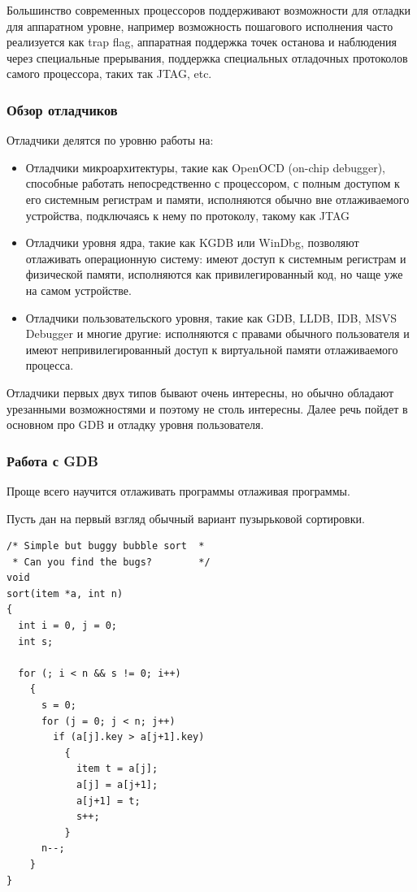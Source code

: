 \documentclass[a4paper,12pt,oneside]{article}
\begin{document}
Большинство современных процессоров поддерживают возможности для отладки для аппаратном уровне, например возможность пошагового исполнения часто реализуется как trap flag, аппаратная поддержка точек останова и наблюдения через специальные прерывания, поддержка специальных отладочных протоколов самого процессора, таких так JTAG, etc.

\subsubsection{Обзор отладчиков}\label{subsubsec:Overview}

Отладчики делятся по уровню работы на:

\begin{itemize}
\item Отладчики микроархитектуры, такие как OpenOCD (on-chip debugger), способные работать непосредственно с процессором, с полным доступом к его системным регистрам и памяти, исполняются обычно вне отлаживаемого устройства, подключаясь к нему по протоколу, такому как JTAG

\item Отладчики уровня ядра, такие как KGDB или WinDbg, позволяют отлаживать операционную систему: имеют доступ к системным регистрам и физической памяти, исполняются как привилегированный код, но чаще уже на самом устройстве.

\item Отладчики пользовательского уровня, такие как GDB, LLDB, IDB, MSVS Debugger и многие другие: исполняются с правами обычного пользователя и имеют непривилегированный доступ к виртуальной памяти отлаживаемого процесса.
\end{itemize}

Отладчики первых двух типов бывают очень интересны, но обычно обладают урезанными возможностями и поэтому не столь интересны. Далее речь пойдет в основном про GDB и отладку уровня пользователя.

\subsubsection{Работа с GDB}\label{subsubsec:GDB}

Проще всего научится отлаживать программы отлаживая программы. 

Пусть дан на первый взгляд обычный вариант пузырьковой сортировки.

\begin{lstlisting}
/* Simple but buggy bubble sort  *
 * Can you find the bugs?        */
void 
sort(item *a, int n) 
{ 
  int i = 0, j = 0;
  int s;

  for (; i < n && s != 0; i++) 
    {
      s = 0;
      for (j = 0; j < n; j++) 
        if (a[j].key > a[j+1].key)   
          {
            item t = a[j];
            a[j] = a[j+1];
            a[j+1] = t;
            s++;
          }
      n--;
    }
}
\end{lstlisting}
\end{document}
